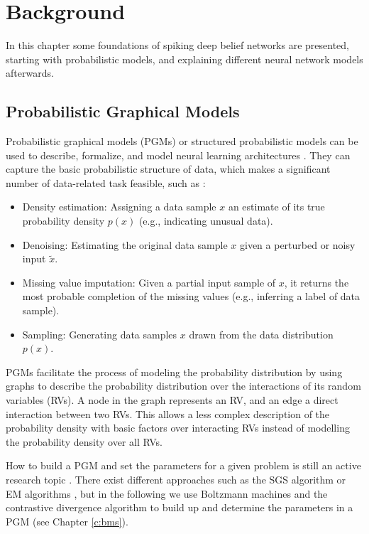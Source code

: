 \chapter{Background} \label{c:backgrnd}

In this chapter some foundations of spiking deep belief networks are presented, starting with probabilistic models, and explaining different neural network models afterwards.

\section{Probabilistic Graphical Models} \label{c:pgms}

Probabilistic graphical models (PGMs) or structured probabilistic models can be used to describe, formalize, and model neural learning architectures \cite{Goodfellow-et-al-2016-Book}\cite{Petrovici2016}.
They can capture the basic probabilistic structure of data, which makes a significant number of data-related task feasible, such as \cite{Goodfellow-et-al-2016-Book}:
\begin{itemize}

\item Density estimation: Assigning a data sample $x$ an estimate of its true probability density $p(x)$ (e.g., indicating unusual data).

\item Denoising: Estimating the original data sample $x$ given a perturbed or noisy input $\widetilde{x}$.  

\item Missing value imputation: Given a partial input sample of $x$, it returns the most probable completion of the missing values (e.g., inferring a label of data sample).

\item Sampling: Generating data samples $x$ drawn from the data distribution $p(x)$. 

\end{itemize}  

PGMs facilitate the process of modeling the probability distribution by using graphs to describe the probability distribution over the interactions of its random variables (RVs).
A node in the graph represents an RV, and an edge a direct interaction between two RVs.
This allows a less complex description of the probability density with basic factors over interacting RVs instead of modelling the probability density over all RVs. 

How to build a PGM and set the parameters for a given problem is still an active research topic \cite{Ghahramani2002}\cite{Zhou2007}.
There exist different approaches such as the SGS algorithm \cite{Zhou2007} or EM algorithms \cite{Ghahramani2002}, but in the following we use Boltzmann machines and the contrastive divergence algorithm to build up and determine the parameters in a PGM (see Chapter \ref{c:bms}).

